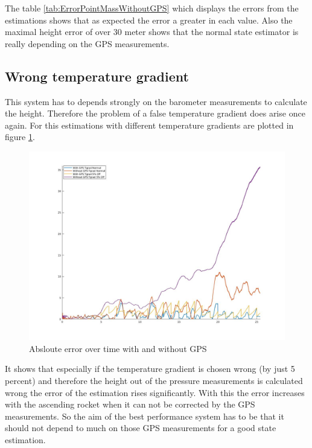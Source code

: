 The table \ref{tab:ErrorPointMassWithoutGPS} which displays the errors from the estimations shows that as expected the error a greater in each value.
Also the maximal height error of over 30 meter shows that the normal state estimator is really depending on the GPS measurements.

\subsection{Wrong temperature gradient}
This system has to depends strongly on the barometer measurements to calculate the height.
Therefore the problem of a false temperature gradient does arise once again.
For this estimations with different temperature gradients are plotted in figure \ref{fig:PointMassWithWithoutGPS}. 

\begin{figure}[h!]
 \centering
 \includegraphics[width=.8\textwidth]{./Pictures/PointMassWithWithoutGPS.jpg}
 \caption{Absloute error over time with and without GPS}
 \label{fig:PointMassWithWithoutGPS}
\end{figure}

It shows that especially if the temperature gradient is chosen wrong (by just 5 percent) and
therefore the height out of the pressure measurements is calculated wrong the error of the estimation rises significantly.
With this the error increases with the ascending rocket when it can not be corrected by the GPS measurements.
So the aim of the best performance system has to be that it should not depend to much on those GPS measurements for a good state estimation.

\newpage
